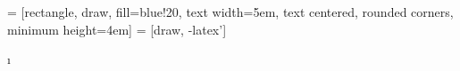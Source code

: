 \documentclass[11pt,a4paper]{report}
\begin{document}
 
	\sloppy
	
	\setcounter{tocdepth}{4} %
	
	
	
	
	
	
	
	 = [rectangle, draw, fill=blue!20, 
	text width=5em, text centered, rounded corners, minimum height=4em]
	 = [draw, -latex']
	
	
	
	
	
	

	
	\i%
	
 
	
	
	
%	
	
	
%	
	
%	
	
	
\end{document}
